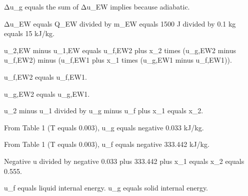 Δu_g equals the sum of Δu_EW implies because adiabatic.  

Δu_EW equals Q_EW divided by m_EW equals 1500 J divided by 0.1 kg equals 15 kJ/kg.  

u_2,EW minus u_1,EW equals u_f,EW2 plus x_2 times (u_g,EW2 minus u_f,EW2) minus (u_f,EW1 plus x_1 times (u_g,EW1 minus u_f,EW1)).  

u_f,EW2 equals u_f,EW1.  

u_g,EW2 equals u_g,EW1.  

u_2 minus u_1 divided by u_g minus u_f plus x_1 equals x_2.  

From Table 1 (T equals 0.003), u_g equals negative 0.033 kJ/kg.  

From Table 1 (T equals 0.003), u_f equals negative 333.442 kJ/kg.  

Negative u divided by negative 0.033 plus 333.442 plus x_1 equals x_2 equals 0.555.  

u_f equals liquid internal energy.  
u_g equals solid internal energy.